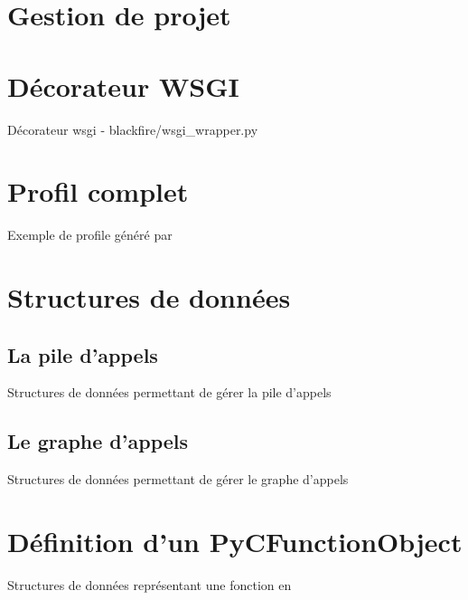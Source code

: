 \chapter{Gestion de projet}



\chapter{Décorateur WSGI}
  \label{app:decorateurwsgi}
  \begin{listing}[H]
    \caption{Décorateur wsgi - blackfire/wsgi\_wrapper.py}
  \end{listing}
 
\chapter{Profil complet}
  \label{app:fullProfile}
  \begin{listing}[H]
    \caption{Exemple de profile généré par \Blackfire}
  \end{listing}
 
\chapter{Structures de données}
  \section{La pile d'appels}
    \label{app:pile_struct}
    \begin{listing}[H]
      \caption{Structures de données permettant de gérer la pile d'appels}
    \end{listing}
  \section{Le graphe d'appels}
    \label{app:graph_struct}
    \begin{listing}[H]
      \caption{Structures de données permettant de gérer le graphe d'appels}
    \end{listing}
 
\chapter{Définition d'un PyCFunctionObject}
  \label{app:PyCFunctionObject}
  \begin{listing}[H]
    \caption{Structures de données représentant une fonction \C en \Python}
  \end{listing}
 

